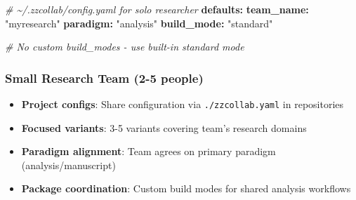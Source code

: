 \documentclass[
]{article}
\newenvironment{Shaded}{\begin{snugshade}}{\end{snugshade}}
\newcommand{\AttributeTok}[1]{\textcolor[rgb]{0.13,0.29,0.53}{#1}}
\newcommand{\CommentTok}[1]{\textcolor[rgb]{0.56,0.35,0.01}{\textit{#1}}}
\newcommand{\FunctionTok}[1]{\textcolor[rgb]{0.13,0.29,0.53}{\textbf{#1}}}
\newcommand{\KeywordTok}[1]{\textcolor[rgb]{0.13,0.29,0.53}{\textbf{#1}}}
\newcommand{\StringTok}[1]{\textcolor[rgb]{0.31,0.60,0.02}{#1}}
\providecommand{\tightlist}{%
  \setlength{\itemsep}{0pt}\setlength{\parskip}{0pt}}
\begin{document}
\begin{Shaded}
\begin{Highlighting}[]
\CommentTok{\# \textasciitilde{}/.zzcollab/config.yaml for solo researcher}
\FunctionTok{defaults}\KeywordTok{:}
\AttributeTok{  }\FunctionTok{team\_name}\KeywordTok{:}\AttributeTok{ }\StringTok{"myresearch"}
\AttributeTok{  }\FunctionTok{paradigm}\KeywordTok{:}\AttributeTok{ }\StringTok{"analysis"}
\AttributeTok{  }\FunctionTok{build\_mode}\KeywordTok{:}\AttributeTok{ }\StringTok{"standard"}

\CommentTok{\# No custom build\_modes {-} use built{-}in standard mode}
\end{Highlighting}
\end{Shaded}

\subsubsection{Small Research Team (2-5
people)}\label{small-research-team-2-5-people}

\begin{itemize}
\tightlist
\item
  \textbf{Project configs}: Share configuration via
  \texttt{./zzcollab.yaml} in repositories
\item
  \textbf{Focused variants}: 3-5 variants covering team's research
  domains
\item
  \textbf{Paradigm alignment}: Team agrees on primary paradigm
  (analysis/manuscript)
\item
  \textbf{Package coordination}: Custom build modes for shared analysis
  workflows
\end{itemize}
\end{document}
